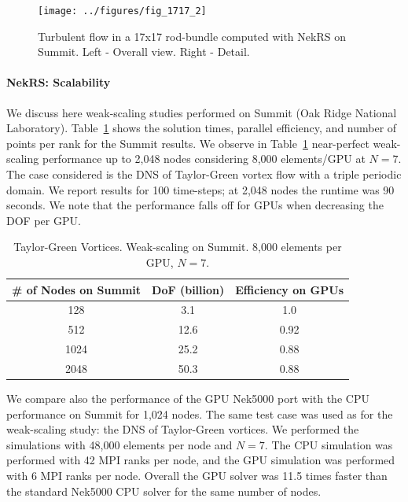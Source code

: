 \documentclass[11pt,letterpaper,english]{article}
\begin{document}
\begin{figure}[h]
\centering
\texttt{[image: ../figures/fig\_1717\_2]}
\caption{Turbulent flow in a 17x17 rod-bundle computed with NekRS on Summit. Left - Overall view. Right - Detail.}
\label{fig:nekrs2}
\end{figure}

\paragraph{NekRS: Scalability}  We discuss here weak-scaling studies performed on Summit (Oak Ridge National Laboratory). Table~\ref{wscaling} shows the solution times, parallel efficiency, and number of points per rank for the Summit results.  We observe in Table~\ref{wscaling} near-perfect weak-scaling performance up to 2,048 nodes considering 8,000 elements/GPU at $N=7$. The case considered is the DNS of Taylor-Green vortex flow with a triple periodic domain. We report results for 100 time-steps; at 2,048 nodes the runtime was 90 seconds. We note that the performance falls off for GPUs when decreasing the DOF per GPU.

\begin{table} [!h]
\begin{center} \begin{tabular}{ccc}
 \hline
\# of Nodes on Summit & DoF (billion) &  Efficiency on GPUs \\
 \hline
 128  & 3.1  & 1.0   \\
 512  & 12.6 & 0.92  \\
 1024 & 25.2 & 0.88  \\
 2048 & 50.3 & 0.88 \\
 \hline
\end{tabular} \end{center}
\caption{\label{wscaling} Taylor-Green Vortices. Weak-scaling on Summit. 8,000 elements per GPU, $N=7$.}
\end{table}

We compare also the performance of the GPU Nek5000 port with the CPU performance on Summit for 1,024 nodes. The same test case was used as for the weak-scaling study: the DNS of Taylor-Green vortices. We performed the simulations with 48,000 elements per node and $N=7$. The CPU simulation was performed with 42 MPI ranks per node, and the GPU simulation was performed with 6 MPI ranks per node. Overall the GPU solver was 11.5 times faster than the standard Nek5000 CPU solver for the same number of nodes.
\end{document}
